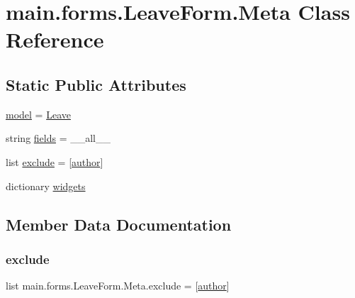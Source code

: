 \hypertarget{classmain_1_1forms_1_1LeaveForm_1_1Meta}{}\section{main.\+forms.\+Leave\+Form.\+Meta Class Reference}
\label{classmain_1_1forms_1_1LeaveForm_1_1Meta}
\subsection*{Static Public Attributes}
\begin{DoxyCompactItemize}
\item 
\hyperlink{classmain_1_1forms_1_1LeaveForm_1_1Meta_aca5a4d8bdfe411a83e2742e932c22f88}{model} = \hyperlink{classmain_1_1models_1_1Leave}{Leave}
\item 
string \hyperlink{classmain_1_1forms_1_1LeaveForm_1_1Meta_a91d9ecd0c97506cb55f5cab95d92f265}{fields} = \textquotesingle{}\+\_\+\+\_\+all\+\_\+\+\_\+\textquotesingle{}
\item 
list \hyperlink{classmain_1_1forms_1_1LeaveForm_1_1Meta_ab15b924faea2e9d3cb0906cb6f7c256d}{exclude} = \mbox{[}\textquotesingle{}\hyperlink{classmain_1_1forms_1_1LeaveForm_a406203f05df243ac808f0722a086964b}{author}\textquotesingle{}\mbox{]}
\item 
dictionary \hyperlink{classmain_1_1forms_1_1LeaveForm_1_1Meta_a04fc19ef83ade3b8d4e1f9d13cac5dcf}{widgets}
\end{DoxyCompactItemize}


\subsection{Member Data Documentation}
\mbox{\label{classmain_1_1forms_1_1LeaveForm_1_1Meta_ab15b924faea2e9d3cb0906cb6f7c256d}} 
\subsubsection{\texorpdfstring{exclude}{exclude}}
{\footnotesize\ttfamily list main.\+forms.\+Leave\+Form.\+Meta.\+exclude = \mbox{[}\textquotesingle{}\hyperlink{classmain_1_1forms_1_1LeaveForm_a406203f05df243ac808f0722a086964b}{author}\textquotesingle{}\mbox{]}\hspace{0.3cm}{\ttfamily [static]}}

